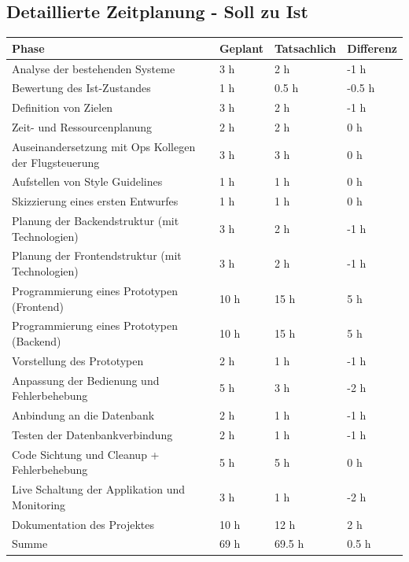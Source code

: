 \begin{appendices}
\section{Detaillierte Zeitplanung - Soll zu Ist}

\begin{table}[htp]

	\begin{center}
		\begin{tabular}{llll} \toprule
			Phase & Geplant & Tatsachlich & Differenz\\ \bottomrule
			Analyse der bestehenden Systeme & 3 h & 2 h & -1 h \\
			Bewertung des Ist-Zustandes & 1 h & 0.5 h & -0.5 h \\
			Definition von Zielen & 3 h & 2 h & -1 h \\
			Zeit- und Ressourcenplanung & 2 h & 2 h & 0 h \\
			Auseinandersetzung mit Ops Kollegen der Flugsteuerung & 3 h & 3 h & 0 h \\
			Aufstellen von Style Guidelines & 1 h & 1 h & 0 h \\
			Skizzierung eines ersten Entwurfes & 1 h & 1 h & 0 h \\
			Planung der Backendstruktur (mit Technologien) & 3 h & 2 h & -1 h \\
			Planung der Frontendstruktur (mit Technologien) & 3 h & 2 h & -1 h \\
			Programmierung eines Prototypen (Frontend) & 10 h & 15 h & 5 h \\
			Programmierung eines Prototypen (Backend) & 10 h & 15 h & 5 h \\
			Vorstellung des Prototypen & 2 h & 1 h & -1 h \\
			Anpassung der Bedienung und Fehlerbehebung & 5 h & 3 h & -2 h \\
			Anbindung an die Datenbank & 2 h & 1 h & -1 h \\
			Testen der Datenbankverbindung & 2 h & 1 h & -1 h \\
			Code Sichtung und Cleanup + Fehlerbehebung & 5 h & 5 h & 0 h \\
			Live Schaltung der Applikation und Monitoring & 3 h & 1 h & -2 h \\
			Dokumentation des Projektes & 10 h & 12 h & 2 h \\ \bottomrule
		
			Summe & 69 h & 69.5 h & 0.5 h \\
		\end{tabular}
	\end{center}
\end{table}
\newpage



\end{appendices}
